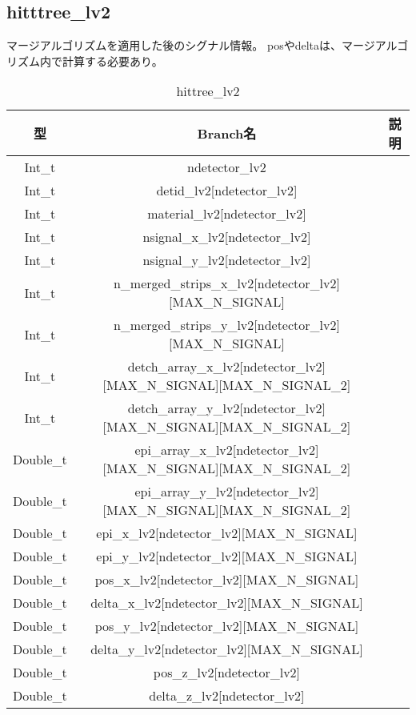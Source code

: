 \documentclass[10.5pt]{jsarticle}
\begin{document}
\subsection{hitttree\_lv2}
マージアルゴリズムを適用した後のシグナル情報。
posやdeltaは、マージアルゴリズム内で計算する必要あり。
\begin{table}[htb]
\begin{center}
  \begin{tabular}{|c|c|c|} \hline
型 & Branch名 & 説明 \\ \hline
Int\_t & ndetector\_lv2& \\
Int\_t & detid\_lv2[ndetector\_lv2]& \\
Int\_t & material\_lv2[ndetector\_lv2]& \\
Int\_t &nsignal\_x\_lv2[ndetector\_lv2]& \\
Int\_t &nsignal\_y\_lv2[ndetector\_lv2]& \\
Int\_t &n\_merged\_strips\_x\_lv2[ndetector\_lv2][MAX\_N\_SIGNAL]& \\
Int\_t &n\_merged\_strips\_y\_lv2[ndetector\_lv2][MAX\_N\_SIGNAL]& \\
Int\_t &detch\_array\_x\_lv2[ndetector\_lv2][MAX\_N\_SIGNAL][MAX\_N\_SIGNAL\_2]& \\
Int\_t &detch\_array\_y\_lv2[ndetector\_lv2][MAX\_N\_SIGNAL][MAX\_N\_SIGNAL\_2]& \\
Double\_t& epi\_array\_x\_lv2[ndetector\_lv2][MAX\_N\_SIGNAL][MAX\_N\_SIGNAL\_2]& \\
Double\_t& epi\_array\_y\_lv2[ndetector\_lv2][MAX\_N\_SIGNAL][MAX\_N\_SIGNAL\_2]& \\
Double\_t& epi\_x\_lv2[ndetector\_lv2][MAX\_N\_SIGNAL]& \\
Double\_t& epi\_y\_lv2[ndetector\_lv2][MAX\_N\_SIGNAL]& \\
Double\_t& pos\_x\_lv2[ndetector\_lv2][MAX\_N\_SIGNAL]& \\
Double\_t& delta\_x\_lv2[ndetector\_lv2][MAX\_N\_SIGNAL]& \\
Double\_t& pos\_y\_lv2[ndetector\_lv2][MAX\_N\_SIGNAL]& \\
Double\_t& delta\_y\_lv2[ndetector\_lv2][MAX\_N\_SIGNAL]& \\
Double\_t& pos\_z\_lv2[ndetector\_lv2]& \\
Double\_t& delta\_z\_lv2[ndetector\_lv2]& \\
 \hline
  \end{tabular}
  \caption{hittree\_lv2}
   \end{center}
\end{table}
\end{document}
